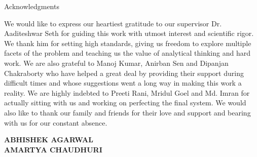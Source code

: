 \begin{center}
\LARGE{Acknowledgments}  %
\end{center}

\vspace{0.5in}

We would like to express our heartiest gratitude to our supervisor Dr. Aaditeshwar Seth for guiding this work with utmost interest and scientific rigor. We thank him for setting high standards, giving us freedom to explore multiple facets of the problem and teaching us the value of analytical thinking and hard work. We are also grateful to Manoj Kumar, Anirban Sen and Dipanjan Chakraborty who have helped a great deal by providing their support during difficult times and whose suggestions went a long way in making this work a reality. We are highly indebted to Preeti Rani, Mridul Goel and Md. Imran for actually sitting with us and working on perfecting the final system. We would also like to thank our family and friends for their love and support and bearing with us for our constant absence.\\

\vspace{1.5in}

{\bfseries ABHISHEK AGARWAL}\\
{\bfseries AMARTYA CHAUDHURI}

